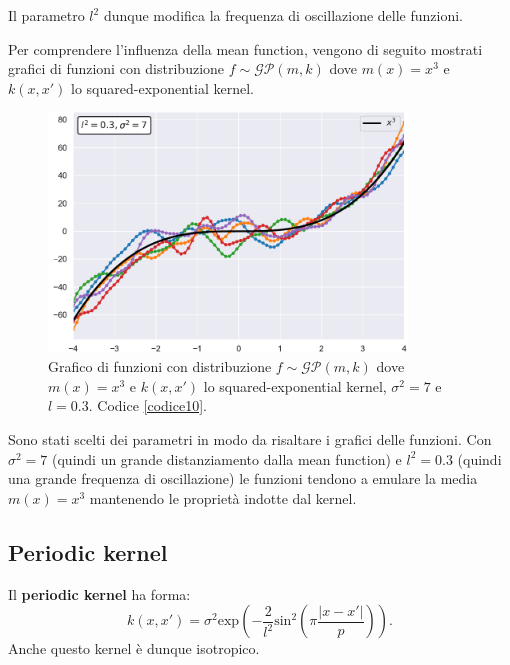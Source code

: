 Il parametro $l^2$ dunque modifica la frequenza di oscillazione delle funzioni.

\newpage

Per comprendere l'influenza della mean function, vengono di seguito mostrati grafici di funzioni con distribuzione $f\sim \mathcal{GP}(m,k)$ dove $m(x)=x^3$ e $k(x,x')$ lo squared-exponential kernel.
\begin{figure}[h]
    \centering
    \includegraphics[width=0.85\textwidth]{images/Gaussian process/RBF - cubedmean.pdf}
    \caption{Grafico di funzioni con distribuzione  $f\sim \mathcal{GP}(m,k)$ dove $m(x)=x^3$ e $k(x,x')$ lo squared-exponential kernel, $\sigma^2=7$ e $l=0.3$. Codice \ref{codice10}.}
    \label{10 sample exponential kernel cubed mean}
\end{figure}

Sono stati scelti dei parametri in modo da risaltare i grafici delle funzioni. Con $\sigma^2=7$ (quindi un grande distanziamento dalla mean function) e $l^2=0.3$ (quindi una grande frequenza di oscillazione) le funzioni tendono a emulare la media $m(x)=x^3$ mantenendo le proprietà indotte dal kernel.

\newpage








\newpage

\subsection{Periodic kernel}

\begin{defi}
Il \textbf{periodic kernel} ha forma:
\[
k(x,x')=\sigma^2 \text{exp}\left( -\frac{2}{l^2} \text{sin}^2\left( \pi \frac{|x-x'|}{p}\right)\right).
\]
Anche questo kernel è dunque isotropico.
\end{defi}

